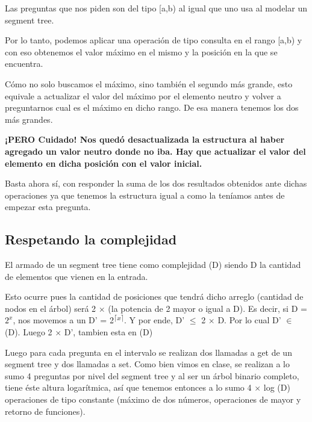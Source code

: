 Las preguntas que nos piden son del tipo [a,b) al igual que uno usa al modelar un segment tree.\newline

Por lo tanto, podemos aplicar una operación de tipo consulta en el rango [a,b) y con eso obtenemos el valor máximo en el mismo y la posición en la que se encuentra.\newline

Cómo no solo buscamos el máximo, sino también el segundo más grande, esto equivale a actualizar el valor del máximo por el elemento neutro y volver a preguntarnos cual es el máximo en dicho rango. De esa manera tenemos los dos más grandes.\newline

\textbf{¡PERO Cuidado! Nos quedó desactualizada la estructura al haber agregado un valor neutro donde no iba. Hay que actualizar el valor del elemento en dicha posición con el valor inicial.}\newline

Basta ahora sí, con responder la suma de los dos resultados obtenidos ante dichas operaciones ya que tenemos la estructura igual a como la teníamos antes de empezar esta pregunta.

\subsection{Respetando la complejidad}

El armado de un segment tree tiene como complejidad \bigo(D) siendo D la cantidad de elementos que vienen en la entrada.\newline

Esto ocurre pues la cantidad de posiciones que tendrá dicho arreglo (cantidad de nodos en el árbol) será 2 $\times$ (la potencia de 2 mayor o igual a D). 
Es decir, si D = $2^x$, nos movemos a un D' = 2\textsuperscript{$\lceil x \rceil$}. Y por ende, D' $\leq$ 2 $\times$ D. Por lo cual D' $\in$ \bigo(D). 
Luego 2 $\times$ D', tambien esta en \bigo(D) \newline

Luego para cada pregunta en el intervalo se realizan dos llamadas a get de un segment tree y dos llamadas a set. Como bien vimos en clase, se realizan a lo sumo 4 preguntas por nivel del segment tree y al ser un árbol binario completo, tiene éste altura logarítmica, así que tenemos entonces a lo sumo 4 $\times$ log (D) operaciones de tipo constante (máximo de dos números, operaciones de mayor y retorno de funciones).\newline

